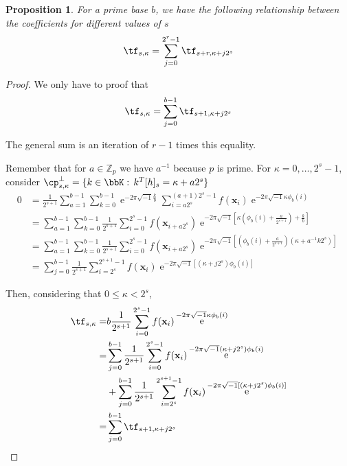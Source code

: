\documentclass[]{elsarticle}
\DeclareMathOperator{\e}{e}
\newcommand{\cfourier}[1]{\ensuremath{\e^{-2\pi\sqrt{-1}#1}}}
\newtheorem{prop}[theorem]{Proposition}
\theoremstyle{definition}
\theoremstyle{remark}
\begin{document}
\begin{prop}
For a prime base $b$, we have the following relationship between the coefficients for different values of $s$
\begin{equation}
\tf_{s,\kappa}=\sum_{j=0}^{2^r-1}\tf_{s+r,\kappa+j2^s}
\end{equation}
\end{prop}
\begin{proof}
We only have to proof that
\begin{equation}\label{proof_sum}
\tf_{s,\kappa}=\sum_{j=0}^{b-1}\tf_{s+1,\kappa+j2^s}
\end{equation}

The general sum is an iteration of $r-1$ times this equality.

Remember that for $a\in\mathbb{Z}_p$ we have $a^{-1}$ because $p$ is prime. For $\kappa=0,\dots,2^s-1$, consider $\cp^{\perp}_{s,\kappa}=\{k\in\bbK:\,k^T[h]_s=\kappa+a2^s\}$
\begin{equation}
\begin{split}
0&=\frac{1}{2^{s+1}}\sum_{a=1}^{b-1}\sum_{k=0}^{b-1}\cfourier{\frac{k}{b}}\sum_{i=a2^s}^{(a+1)2^s-1}f(\mathbf{x}_i)\cfourier{\kappa\phi_b(i)}\\
&=\sum_{a=1}^{b-1}\sum_{k=0}^{b-1}\frac{1}{2^{s+1}}\sum_{i=0}^{2^s-1}f(\mathbf{x}_{i+a2^s})\cfourier{\left[\kappa\left(\phi_b(i)+\frac{a}{2^{s+1}}\right)+\frac{k}{b}\right]}\\
&=\sum_{a=1}^{b-1}\sum_{k=0}^{b-1}\frac{1}{2^{s+1}}\sum_{i=0}^{2^s-1}f(\mathbf{x}_{i+a2^s})\cfourier{\left[\left(\phi_b(i)+\frac{a}{2^{s+1}}\right)\left(\kappa+a^{-1}k2^s\right)\right]}\\
&=\sum_{j=0}^{b-1}\frac{1}{2^{s+1}}\sum_{i=2^s}^{2^{s+1}-1}f(\mathbf{x}_{i})\cfourier{\left[\left(\kappa+j2^s\right)\phi_b(i)\right]}
\end{split}
\end{equation}

Then, considering that $0\leq \kappa<2^s$,
\begin{equation}
\begin{split}
\tf_{s,\kappa}=&b\frac{1}{2^{s+1}}\sum_{i=0}^{2^s-1}f(\mathbf{x}_i)\cfourier{\kappa\phi_b(i)}\\
=&\sum_{j=0}^{b-1}\frac{1}{2^{s+1}}\sum_{i=0}^{2^s-1}f(\mathbf{x}_i)\cfourier{\left(\kappa+j2^s\right)\phi_b(i)}\\
&+\sum_{j=0}^{b-1}\frac{1}{2^{s+1}}\sum_{i=2^s}^{2^{s+1}-1}f(\mathbf{x}_{i})\cfourier{\left[\left(\kappa+j2^s\right)\phi_b(i)\right]}\\
=&\sum_{j=0}^{b-1}\tf_{s+1,\kappa+j2^s}
\end{split}
\end{equation}
\end{proof}
\end{document}
